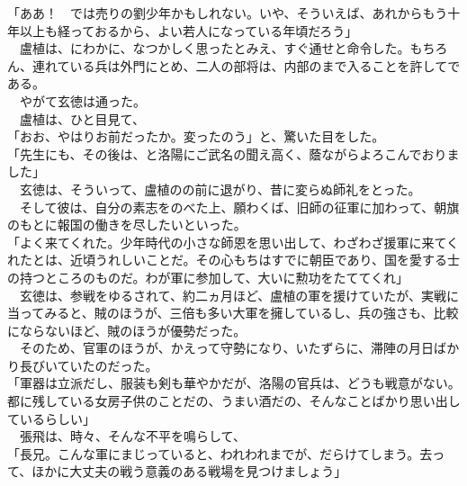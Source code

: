 \documentclass[
  paper=a5,
  fontsize=10pt,
  jafontsize=9.5pt,
  tate,                  %
  open_bracket_pos=nibu, %
]{jlreq}
\begin{document}
「ああ！　では売りの劉少年かもしれない。いや、そういえば、あれからもう十年以上も経っておるから、よい若人になっている年頃だろう」\\


　盧植は、にわかに、なつかしく思ったとみえ、すぐ通せと命令した。もちろん、連れている兵は外門にとめ、二人の部将は、内部のまで入ることを許してである。\\


　やがて玄徳は通った。\\


　盧植は、ひと目見て、\\


「おお、やはりお前だったか。変ったのう」と、驚いた目をした。\\


「先生にも、その後は、と洛陽にご武名の聞え高く、蔭ながらよろこんでおりました」\\


　玄徳は、そういって、盧植のの前に退がり、昔に変らぬ師礼をとった。\\


　そして彼は、自分の素志をのべた上、願わくば、旧師の征軍に加わって、朝旗のもとに報国の働きを尽したいといった。\\


「よく来てくれた。少年時代の小さな師恩を思い出して、わざわざ援軍に来てくれたとは、近頃うれしいことだ。その心もちはすでに朝臣であり、国を愛する士の持つところのものだ。わが軍に参加して、大いに勲功をたててくれ」\\


　玄徳は、参戦をゆるされて、約二ヵ月ほど、盧植の軍を援けていたが、実戦に当ってみると、賊のほうが、三倍も多い大軍を擁しているし、兵の強さも、比較にならないほど、賊のほうが優勢だった。\\


　そのため、官軍のほうが、かえって守勢になり、いたずらに、滞陣の月日ばかり長びいていたのだった。\\


「軍器は立派だし、服装も剣も華やかだが、洛陽の官兵は、どうも戦意がない。都に残している女房子供のことだの、うまい酒だの、そんなことばかり思い出しているらしい」\\


　張飛は、時々、そんな不平を鳴らして、\\


「長兄。こんな軍にまじっていると、われわれまでが、だらけてしまう。去って、ほかに大丈夫の戦う意義のある戦場を見つけましょう」\\
\end{document}
